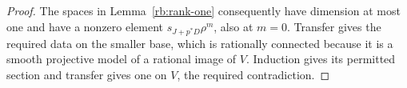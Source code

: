 \begin{proof}
The spaces in Lemma~\ref{rb:rank-one} consequently have dimension at
most one and have a nonzero element $s_{J+p^*D}\rho^m$, also at $m=0$.
Transfer gives the required data on the smaller base, which is
rationally connected because it is a smooth projective model of a
rational image of $V$.  Induction gives its permitted section and
transfer gives one on $V$, the required contradiction.
\end{proof}

